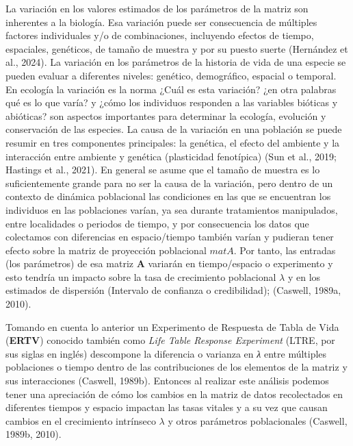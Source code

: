 \documentclass[
  12pt,
  letterpaper,
]{book}
\begin{document}
La variación en los valores estimados de los parámetros de la matriz son
inherentes a la biología. Esa variación puede ser consecuencia de
múltiples factores individuales y/o de combinaciones, incluyendo efectos
de tiempo, espaciales, genéticos, de tamaño de muestra y por su puesto
suerte (Hernández et al., 2024). La variación en los parámetros de la
historia de vida de una especie se pueden evaluar a diferentes niveles:
genético, demográfico, espacial o temporal. En ecología la variación es
la norma ¿Cuál es esta variación? ¿en otra palabras qué es lo que varía?
y ¿cómo los individuos responden a las variables bióticas y abióticas?
son aspectos importantes para determinar la ecología, evolución y
conservación de las especies. La causa de la variación en una población
se puede resumir en tres componentes principales: la genética, el efecto
del ambiente y la interacción entre ambiente y genética (plasticidad
fenotípica) (Sun et al., 2019; Hastings et al., 2021). En general se
asume que el tamaño de muestra es lo suficientemente grande para no ser
la causa de la variación, pero dentro de un contexto de dinámica
poblacional las condiciones en las que se encuentran los individuos en
las poblaciones varían, ya sea durante tratamientos manipulados, entre
localidades o periodos de tiempo, y por consecuencia los datos que
colectamos con diferencias en espacio/tiempo también varían y pudieran
tener efecto sobre la matriz de proyección poblacional \(matA\). Por
tanto, las entradas (los parámetros) de esa matriz \textbf{A} variarán
en tiempo/espacio o experimento y esto tendría un impacto sobre la tasa
de crecimiento poblacional \(\lambda\) y en los estimados de dispersión
(Intervalo de confianza o credibilidad); (Caswell, 1989a, 2010).

Tomando en cuenta lo anterior un Experimento de Respuesta de Tabla de
Vida (\textbf{ERTV}) conocido también como \emph{Life Table Response
Experiment} (LTRE, por sus siglas en inglés) descompone la diferencia o
varianza en \emph{λ} entre múltiples poblaciones o tiempo dentro de las
contribuciones de los elementos de la matriz y sus interacciones
(Caswell, 1989b). Entonces al realizar este análisis podemos tener una
apreciación de cómo los cambios en la matriz de datos recolectados en
diferentes tiempos y espacio impactan las tasas vitales y a su vez que
causan cambios en el crecimiento intrínseco \(\lambda\) y otros
parámetros poblacionales (Caswell, 1989b, 2010).
\end{document}
